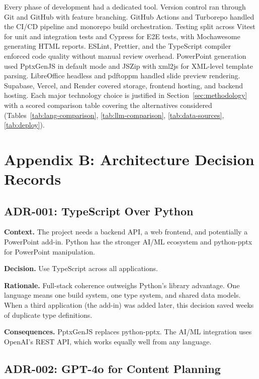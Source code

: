 Every phase of development had a dedicated tool. Version control ran through Git and GitHub with feature branching. GitHub Actions and Turborepo handled the CI/CD pipeline and monorepo build orchestration. Testing split across Vitest for unit and integration tests and Cypress for E2E tests, with Mochawesome generating HTML reports. ESLint, Prettier, and the TypeScript compiler enforced code quality without manual review overhead. PowerPoint generation used PptxGenJS in default mode and JSZip with xml2js for XML-level template parsing. LibreOffice headless and pdftoppm handled slide preview rendering. Supabase, Vercel, and Render covered storage, frontend hosting, and backend hosting. Each major technology choice is justified in Section~\ref{sec:methodology} with a scored comparison table covering the alternatives considered (Tables~\ref{tab:lang-comparison}, \ref{tab:llm-comparison}, \ref{tab:data-sources}, \ref{tab:deploy}).

\newpage

\section*{Appendix B: Architecture Decision Records}

\subsection*{ADR-001: TypeScript Over Python}

\textbf{Context.} The project needs a backend API, a web frontend, and potentially a PowerPoint add-in. Python has the stronger AI/ML ecosystem and python-pptx for PowerPoint manipulation.

\textbf{Decision.} Use TypeScript across all applications.

\textbf{Rationale.} Full-stack coherence outweighs Python's library advantage. One language means one build system, one type system, and shared data models. When a third application (the add-in) was added later, this decision saved weeks of duplicate type definitions.

\textbf{Consequences.} PptxGenJS replaces python-pptx. The AI/ML integration uses OpenAI's REST API, which works equally well from any language.

\subsection*{ADR-002: GPT-4o for Content Planning}

